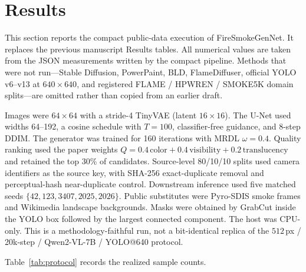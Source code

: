 %
%

\section{Results}
\label{sec:results}

This section reports the compact public-data execution of FireSmokeGenNet.
It replaces the previous manuscript Results tables. All numerical values
are taken from the JSON measurements written by the compact pipeline.
Methods that were not run---Stable Diffusion, PowerPaint, BLD,
FlameDiffuser, official YOLO v6--v13 at \(640\times 640\), and registered
FLAME / HPWREN / SMOKE5K domain splits---are omitted rather than copied
from an earlier draft.

Images were \(64\times 64\) with a stride-4 TinyVAE (latent \(16\times 16\)).
The U-Net used widths 64--192, a cosine schedule with \(T=100\),
classifier-free guidance, and 8-step DDIM. The generator was trained for
160 iterations with MRDL \(\omega=0.4\). Quality ranking used the paper
weights \(Q=0.4\,\mathrm{color}+0.4\,\mathrm{visibility}+0.2\,\mathrm{translucency}\)
and retained the top 30\% of candidates. Source-level 80/10/10 splits used
camera identifiers as the source key, with SHA-256 exact-duplicate removal
and perceptual-hash near-duplicate control. Downstream inference used five
matched seeds \(\{42,123,3407,2025,2026\}\). Public substitutes were
Pyro-SDIS smoke frames and Wikimedia landscape backgrounds. Masks were
obtained by GrabCut inside the YOLO box followed by the largest connected
component. The host was CPU-only. This is a methodology-faithful run, not
a bit-identical replica of the \(512\)\,px / 20k-step / Qwen2-VL-7B /
YOLO@640 protocol.

Table~\ref{tab:protocol} records the realized sample counts.

